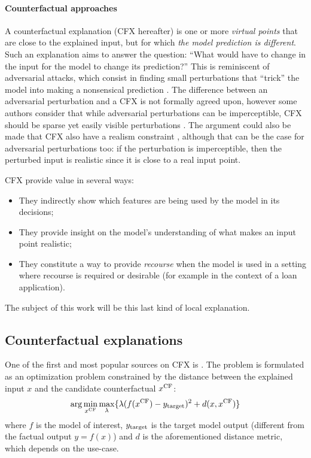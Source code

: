 \documentclass[../main.tex]{subfiles}
\begin{document}

\paragraph{Counterfactual approaches}\label{par:cfx}

A counterfactual explanation (CFX hereafter) is one or more \emph{virtual points} that are close to the explained input, but for which \emph{the model prediction is different}.
Such an explanation aims to answer the question: ``What would have to change in the input for the model to change its prediction?''
This is reminiscent of adversarial attacks, which consist in finding small perturbations that ``trick'' the model into making a nonsensical prediction \cite{szegedyIntriguing2014,moosavi-dezfooliUniversal2017}.
The difference between an adversarial perturbation and a CFX is not formally agreed upon, however some authors consider that while adversarial perturbations can be imperceptible, CFX should be sparse yet easily visible perturbations \cite{laugelLocal2020}. The argument could also be made that CFX also have a realism constraint \citenote{}, although that can be the case for adversarial perturbations too: if the perturbation is imperceptible, then the perturbed input is realistic since it is close to a real input point.

CFX provide value in several ways:
\begin{itemize}
    \item They indirectly show which features are being used by the model in its decisions;
    \item They provide insight on the model's understanding of what makes an input point realistic;
    \item They constitute a way to provide \emph{recourse} when the model is used in a setting where recourse is required or desirable (for example in the context of a loan application).
\end{itemize}

The subject of this work will be this last kind of local explanation.

\subsection{Counterfactual explanations}

One of the first and most popular sources on CFX is \cite{wachterCounterfactual2017}. The problem is formulated as an optimization problem constrained by the distance between the explained input $x$ and the candidate counterfactual $x^\text{CF}$:
\begin{equation}
    \arg\min_{x^\text{CF}} \max_\lambda \{ \lambda (f(x^\text{CF}) - y_{\text{target}})^2 + d(x, x^\text{CF}) \}
\end{equation}
where $f$ is the model of interest, $y_{\text{target}}$ is the target model output (different from the factual output $y = f(x)$) and $d$ is the aforementioned distance metric, which depends on the use-case.
\end{document}
